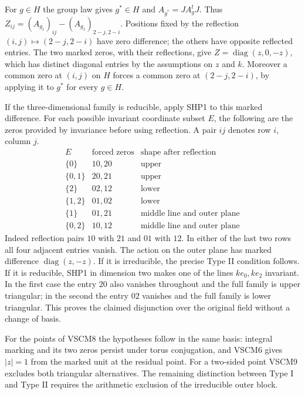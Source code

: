 For $g\in H$ the group law gives $g^*\in H$ and
$A_{g^*}=JA_g^tJ$. Thus $Z_{ij}=(A_{g_1})_{ij}-
(A_{g_1})_{2-j,2-i}$. Positions fixed by the reflection
$(i,j)\mapsto(2-j,2-i)$ have zero difference; the others have
opposite reflected entries. The two marked zeros, with their
reflections, give $Z=\operatorname{diag}(z,0,-z)$, which
has distinct diagonal entries by the assumptions on $z$ and $k$.
Moreover a common zero at $(i,j)$ on $H$ forces a common zero
at $(2-j,2-i)$, by applying it to $g^*$ for every $g\in H$.

If the three-dimensional family is reducible, apply SHP1 to this
marked difference. For each possible invariant coordinate subset
$E$, the following are the zeros provided by invariance before
using reflection. A pair $ij$ denotes row $i$, column $j$.
\[
\begin{array}{c|c|l}
 E & \text{forced zeros} & \text{shape after reflection}\\ \hline
 \{0\}   &10,20& \text{upper}\\
 \{0,1\} &20,21& \text{upper}\\
 \{2\}   &02,12& \text{lower}\\
 \{1,2\} &01,02& \text{lower}\\
 \{1\}   &01,21& \text{middle line and outer plane}\\
 \{0,2\} &10,12& \text{middle line and outer plane}
\end{array}
\]
Indeed reflection pairs $10$ with $21$ and $01$ with $12$. In
either of the last two rows all four adjacent entries vanish.
The action on the outer plane has marked difference
$\operatorname{diag}(z,-z)$. If it is irreducible, the precise
Type II condition follows. If it is reducible, SHP1 in dimension
two makes one of the lines $k e_0,k e_2$ invariant. In the first
case the entry $20$ also vanishes throughout and the full family
is upper triangular; in the second the entry $02$ vanishes and the
full family is lower triangular. This proves the claimed disjunction
over the original field without a change of basis.

For the points of VSCM8 the hypotheses follow in the same basis:
integral marking and its two zeros persist under torus conjugation,
and VSCM6 gives $|z|=1$ from the marked unit at the residual point.
For a two-sided point VSCM9 excludes both triangular alternatives.
The remaining distinction between Type I and Type II requires the
arithmetic exclusion of the irreducible outer block.
